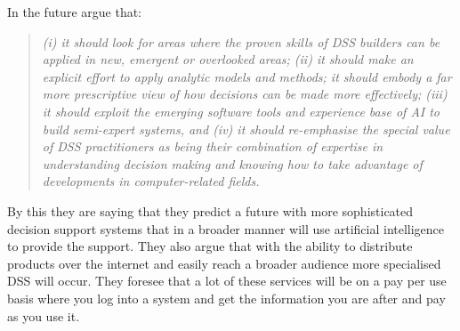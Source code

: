 In the future \cite{shim2002past} argue that:
\begin{quotation}
\textit{(i) it should look for areas where the proven skills of DSS builders can be applied in new, emergent or overlooked areas; (ii) it should make an explicit effort to apply analytic models and methods; it should embody a far more prescriptive view of how decisions can be made more effectively; (iii) it should exploit the emerging software tools and
experience base of AI to build semi-expert systems, and (iv) it should re-emphasise the special value of DSS practitioners as being their combination of expertise in understanding decision making and knowing how to take advantage of developments in computer-related fields.}
\end{quotation}
By this they are saying that they predict a future with more sophisticated decision support systems that in a broader manner will use artificial intelligence to provide the support. They also argue that with the ability to distribute products over the internet and easily reach a broader audience more specialised DSS will occur. They foresee that a lot of these services will be on a pay per use basis where you log into a system and get the information you are after and pay as you use it.

